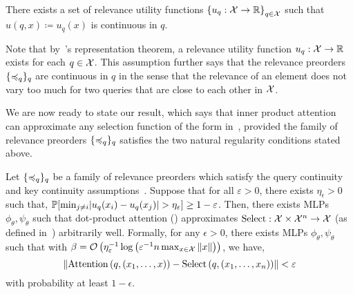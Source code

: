 \begin{assumption}\label{ass:query_cts}
    There exists a set of relevance utility functions $\left\{u_q: {\mathcal{X}} \to \mathbb{R}\right\}_{q \in {\mathcal{X}}}$ such that $u(q, x) \coloneq u_q(x)$ is continuous in $q$.
\end{assumption}

Note that by~'s representation theorem, a relevance utility function $u_q: {\mathcal{X}} \to \mathbb{R}$ exists for each $q \in {\mathcal{X}}$. This assumption further says that the relevance preorders $\{\preccurlyeq_q\}_{q}$ are continuous in $q$ in the sense that the relevance of an element does not vary too much for two queries that are close to each other in ${\mathcal{X}}$.

We are now ready to state our result, which says that inner product attention can approximate any selection function of the form in~, provided the family of relevance preorders $\{\preccurlyeq_q\}_q$ satisfies the two natural regularity conditions stated above.


\begin{theorem}
    Let $\{\preccurlyeq_q\}_q$ be a family of relevance preorders which satisfy the query continuity and key continuity assumptions~. Suppose that for all $\varepsilon > 0$, there exists $\eta_\epsilon > 0$ such that, $\mathbb{P}[\min_{j \neq i} \lvert u_q(x_i) - u_q(x_j)\rvert > \eta_\varepsilon] \geq 1 - \varepsilon$.
    Then, there exists MLPs $\phi_\theta, \psi_\theta$ such that dot-product attention () approximates $\mathrm{Select}: {\mathcal{X}} \times {\mathcal{X}}^n \to {\mathcal{X}}$ (as defined in~) arbitrarily well. Formally, for any $\epsilon > 0$, there exists MLPs $\phi_\theta, \psi_\theta$ such that with $\beta = {\mathcal{O}}\left(\eta_\varepsilon^{-1} \log\left(\varepsilon^{-1} n \max_{x \in {\mathcal{X}}} \left\lVert x\right\rVert\right)\right)$, we have,
    \begin{equation*}
        \norm{\mathrm{Attention}\paren{q, (x_1, \ldots, x)} - \mathrm{Select}\paren{q, (x_1, \ldots, x_n)}} < \epsilon
    \end{equation*}
    with probability at least $1 - \epsilon$.
\end{theorem}

